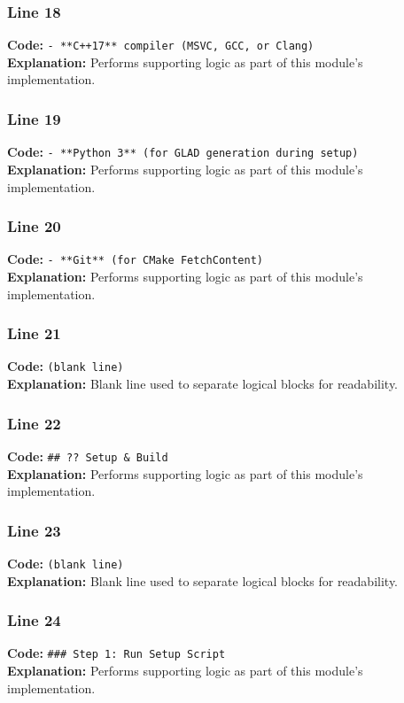 \documentclass[11pt,a4paper]{article}
\begin{document}
\subsubsection*{Line 18}
\textbf{Code:} \verb|- **C++17** compiler (MSVC, GCC, or Clang)|\\
\textbf{Explanation:} Performs supporting logic as part of this module's implementation.

\subsubsection*{Line 19}
\textbf{Code:} \verb|- **Python 3** (for GLAD generation during setup)|\\
\textbf{Explanation:} Performs supporting logic as part of this module's implementation.

\subsubsection*{Line 20}
\textbf{Code:} \verb|- **Git** (for CMake FetchContent)|\\
\textbf{Explanation:} Performs supporting logic as part of this module's implementation.

\subsubsection*{Line 21}
\textbf{Code:} \texttt{(blank line)}\\
\textbf{Explanation:} Blank line used to separate logical blocks for readability.

\subsubsection*{Line 22}
\textbf{Code:} \verb|## ?? Setup & Build|\\
\textbf{Explanation:} Performs supporting logic as part of this module's implementation.

\subsubsection*{Line 23}
\textbf{Code:} \texttt{(blank line)}\\
\textbf{Explanation:} Blank line used to separate logical blocks for readability.

\subsubsection*{Line 24}
\textbf{Code:} \verb|### Step 1: Run Setup Script|\\
\textbf{Explanation:} Performs supporting logic as part of this module's implementation.
\end{document}
